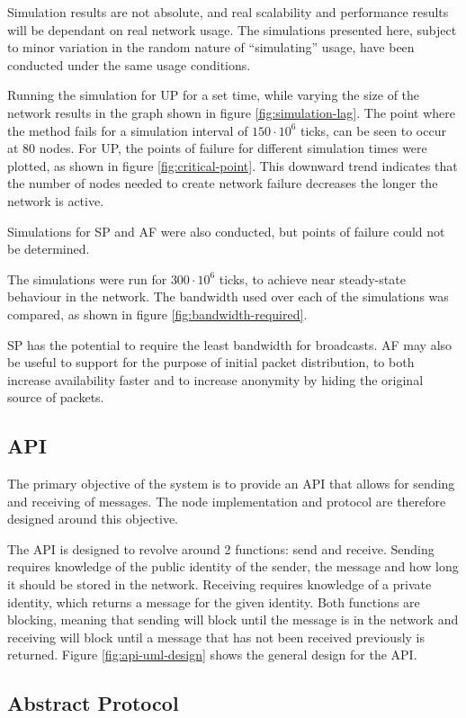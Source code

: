 			Simulation results are not absolute, and real scalability and performance results will be dependant on real network usage. The simulations presented here, subject to minor variation in the random nature of ``simulating'' usage, have been conducted under the same usage conditions.
			
			Running the simulation for UP for a set time, while varying the size of the network results in the graph shown in figure \ref{fig:simulation-lag}. The point where the method fails for a simulation interval of $150\cdot10^6$ ticks, can be seen to occur at 80 nodes. For UP, the points of failure for different simulation times were plotted, as shown in figure \ref{fig:critical-point}. This downward trend indicates that the number of nodes needed to create network failure decreases the longer the network is active.
			
			Simulations for SP and AF were also conducted, but points of failure could not be determined.
			
			The simulations were run for $300\cdot10^6$ ticks, to achieve near steady-state behaviour in the network. 
			The bandwidth used over each of the simulations was compared, as shown in figure \ref{fig:bandwidth-required}.
			
			SP has the potential to require the least bandwidth for broadcasts. AF may also be useful to support for the purpose of initial packet distribution, to both increase availability faster and to increase anonymity by hiding the original source of packets.
			
	\subsection{API}
		The primary objective of the system is to provide an API that allows for sending and receiving of messages. The node implementation and protocol are therefore designed around this objective.
		
		The API is designed to revolve around 2 functions: send and receive. Sending requires knowledge of the public identity of the sender, the message and how long it should be stored in the network. Receiving requires knowledge of a private identity, which returns a message for the given identity. Both functions are blocking, meaning that sending will block until the message is in the network and receiving will block until a message that has not been received previously is returned. Figure \ref{fig:api-uml-design} shows the general design for the API.
	\subsection{Abstract Protocol}
	
